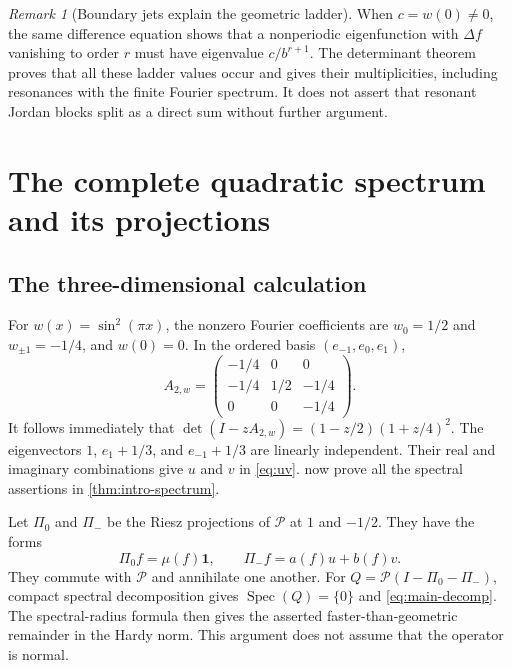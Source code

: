 \documentclass[11pt,a4paper]{article}
\theoremstyle{definition}
\theoremstyle{remark}
\newtheorem{remark}[theorem]{Remark}
\newcommand{\one}{\mathbf 1}
\newcommand{\Pop}{\mathcal P}
\newcommand{\Spec}{\operatorname{Spec}}
\numberwithin{equation}{section}
\begin{document}
\begin{remark}[Boundary jets explain the geometric ladder]
When $c=w(0)\ne0$, the same difference equation shows that a nonperiodic
eigenfunction with $\Delta f$ vanishing to order $r$ must have eigenvalue
$c/b^{r+1}$. The determinant theorem proves that all these ladder values
occur and gives their multiplicities, including resonances with the finite
Fourier spectrum. It does not assert that resonant Jordan blocks split as
a direct sum without further argument.
\end{remark}

\section{The complete quadratic spectrum and its projections}
\label{sec:quadratic}

\subsection{The three-dimensional calculation}
For $w(x)=\sin^2(\pi x)$, the nonzero Fourier coefficients are
$w_0=1/2$ and $w_{\pm1}=-1/4$, and $w(0)=0$. In the ordered basis
$(e_{-1},e_0,e_1)$,
\begin{equation}
 A_{2,w}=
 \begin{pmatrix}
 -1/4&0&0\\
 -1/4&1/2&-1/4\\
 0&0&-1/4
 \end{pmatrix}.
 \label{eq:A2}
\end{equation}
It follows immediately that
$\det(I-zA_{2,w})=(1-z/2)(1+z/4)^2$. The eigenvectors
$1$, $e_1+1/3$, and $e_{-1}+1/3$ are linearly independent.
Their real and imaginary combinations give $u$ and $v$ in \cref{eq:uv}.
 now prove all the spectral
assertions in \cref{thm:intro-spectrum}.

Let $\Pi_0$ and $\Pi_-$ be the Riesz projections of $\Pop$ at $1$ and
$-1/2$. They have the forms
\[
 \Pi_0f=\mu(f)\one,\qquad \Pi_-f=a(f)u+b(f)v.
\]
They commute with $\Pop$ and annihilate one another. For
$Q=\Pop(I-\Pi_0-\Pi_-)$, compact spectral decomposition gives
$\Spec(Q)=\{0\}$ and \cref{eq:main-decomp}. The spectral-radius formula
then gives the asserted faster-than-geometric remainder in the Hardy norm.
This argument does not assume that the operator is normal.
\end{document}
